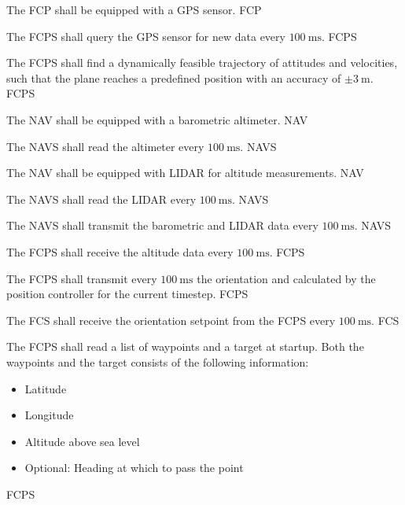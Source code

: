 {
			The FCP shall be equipped with a GPS sensor.
		}
{  }
{FCP}

{
			The FCPS shall query the GPS sensor for new data every $\SI{100}{\milli\second}$.
		}
{  }
{FCPS}

{
			The FCPS shall find a dynamically feasible trajectory of attitudes and velocities, 
			such that the plane reaches a predefined position with an accuracy of $\pm\SI{3}{\meter}$.
		}
{  }
{FCPS}

{
			The NAV shall be equipped with a barometric altimeter.
		}
{  }
{NAV}

{
			The NAVS shall read the altimeter every $\SI{100}{\milli\second}$.
		}
{  }
{NAVS}

{
			The NAV shall be equipped with LIDAR for altitude measurements.
		}
{  }
{NAV}

{
			The NAVS shall read the LIDAR every $\SI{100}{\milli\second}$.
		}
{  }
{NAVS}

{
			The NAVS shall transmit the barometric and LIDAR data every $\SI{100}{\milli\second}$.
		}
{  }
{NAVS}

{
			The FCPS shall receive the altitude data every $\SI{100}{\milli\second}$.
		}
{  }
{FCPS}

{
			The FCPS shall transmit every $\SI{100}{\milli\second}$ the orientation and calculated by the 
			position controller for the current timestep.
		}
{  }
{FCPS}

{
			The FCS shall receive the orientation setpoint from the FCPS every $\SI{100}{\milli\second}$.
		}
{  }
{FCS}

{
			The FCPS shall read a list of waypoints and a target at startup. Both the waypoints and the target 
			consists of the following information: 
			\begin{itemize} 
				\item Latitude 
				\item Longitude 
				\item Altitude above sea level 
				\item Optional: Heading at which to pass the point 
			\end{itemize}
		}
{  }
{FCPS}


